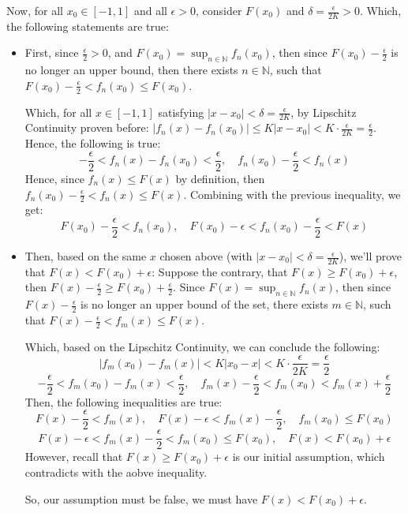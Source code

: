 \documentclass{article}
\begin{document}
Now, for all $x_0\in [-1,1]$ and all $\epsilon>0$, consider $F(x_0)$ and $\delta = \frac{\epsilon}{2K} >0$. Which, the following statements are true:
\begin{itemize}
    \item First, since $\frac{\epsilon}{2}>0$, and $F(x_0)=\sup_{n\in\mathbb{N}}f_n(x_0)$, then since $F(x_0)-\frac{\epsilon}{2}$ is no longer an upper bound,
    then there exists $n\in\mathbb{N}$, such that $F(x_0)-\frac{\epsilon}{2}<f_n(x_0)\leq F(x_0)$.

    Which, for all $x\in [-1,1]$ satisfying $|x-x_0|<\delta = \frac{\epsilon}{2K}$, by Lipschitz Continuity proven before:
    $|f_n(x)-f_n(x_0)|\leq K|x-x_0| < K\cdot \frac{\epsilon}{2K} = \frac{\epsilon}{2}$. Hence, the following is true:
    $$-\frac{\epsilon}{2}<f_n(x)-f_n(x_0)<\frac{\epsilon}{2},\quad f_n(x_0)-\frac{\epsilon}{2}<f_n(x)$$
    Hence, since $f_n(x)\leq F(x)$ by definition, then $f_n(x_0)-\frac{\epsilon}{2}<f_n(x)\leq F(x)$. Combining with the previous inequality, we get:
    $$F(x_0)-\frac{\epsilon}{2}<f_n(x_0),\quad F(x_0)-\epsilon < f_n(x_0)-\frac{\epsilon}{2}< F(x)$$

    \hfill

    \item Then, based on the same $x$ chosen above (with $|x-x_0|<\delta = \frac{\epsilon}{2K}$), we'll prove that $F(x)<F(x_0)+\epsilon$: Suppose the contrary, that $F(x)\geq F(x_0)+\epsilon$, then $F(x)-\frac{\epsilon}{2}\geq F(x_0)+\frac{\epsilon}{2}$.
    Since $F(x)=\sup_{n\in\mathbb{N}}f_n(x)$, then since $F(x)-\frac{\epsilon}{2}$ is no longer an upper bound of the set, there exists $m\in\mathbb{N}$, such that $F(x)-\frac{\epsilon}{2}<f_m(x)\leq F(x)$.

    Which, based on the Lipschitz Continuity, we can conclude the following:
    $$|f_m(x_0)-f_m(x)| < K|x_0-x| < K \cdot \frac{\epsilon}{2K} = \frac{\epsilon}{2}$$
    $$-\frac{\epsilon}{2}<f_m(x_0)-f_m(x)<\frac{\epsilon}{2},\quad f_m(x)-\frac{\epsilon}{2}<f_m(x_0) < f_m(x)+\frac{\epsilon}{2}$$
    Then, the following inequalities are true:
    $$F(x)-\frac{\epsilon}{2}<f_m(x),\quad F(x)-\epsilon<f_m(x)-\frac{\epsilon}{2},\quad f_m(x_0)\leq F(x_0)$$
    $$F(x)-\epsilon < f_m(x)-\frac{\epsilon}{2}<f_m(x_0) \leq F(x_0),\quad F(x) < F(x_0)+\epsilon$$
    However, recall that $F(x)\geq F(x_0)+\epsilon$ is our initial assumption, which contradicts with the aobve inequality.

    So, our assumption must be false, we must have $F(x)<F(x_0)+\epsilon$.
\end{itemize}
\end{document}
